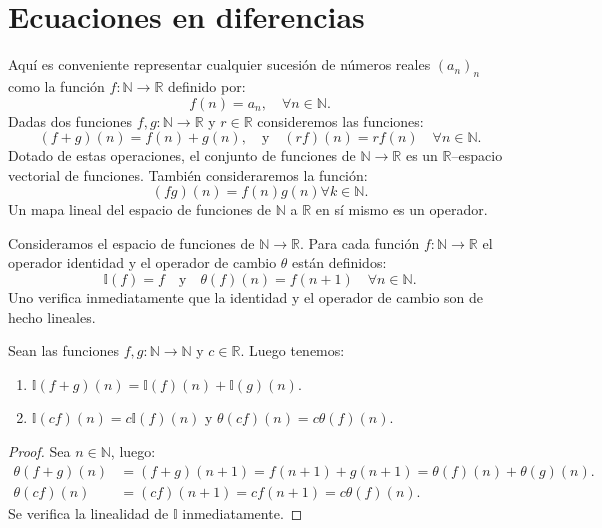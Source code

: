 \section{Ecuaciones en diferencias}

Aquí es conveniente representar cualquier sucesión de números reales $(a_{n})_{n} $ como la función $f\colon\mathds{N}\rightarrow\mathds{R}$ definido por: \[ f(n)=a_{n},\quad\forall n\in\mathds{N}. \] Dadas dos funciones $f,g\colon\mathds{N}\rightarrow\mathds{R}$ y $r\in\mathds{R} $ consideremos las funciones: \[ (f+g)(n)=f(n)+g(n),\quad\text{y}\quad(rf)(n)=rf(n)\quad\forall n\in\mathds{N}. \] Dotado de estas operaciones, el conjunto de funciones de $\mathds{N}\rightarrow\mathds{R}$ es un $\mathds{R}$--espacio vectorial de funciones. También consideraremos la función: \[ (fg)(n)=f(n)g(n)\forall k\in\mathbb{N}. \] Un mapa lineal del espacio de funciones de $\mathds{N}$ a $ \mathds{R}$ en sí mismo es un operador.

\begin{definition}
Consideramos el espacio de funciones de $\mathds{N}\to\mathds{R}$. Para cada función $f\colon\mathds{N}\rightarrow\mathds{R}$ el operador identidad y el operador de cambio $\theta$ están definidos: \[ \mathds{I}(f)=f\quad\text{y}\quad\theta(f)(n)=f(n+1)\quad\forall n\in\mathds{N}. \] Uno verifica inmediatamente que la identidad y el operador de cambio son de hecho lineales.
\end{definition}

\begin{proposition}
Sean las funciones $f,g\colon\mathds{N}\to\mathds{N}$ y $c\in\mathds{R}$. Luego tenemos:
\begin{enumerate}
	\item $\mathds{I}\left(f+g\right)(n)=\mathds{I}(f)(n)+\mathds{I}(g)(n)$.
	\item $\mathds{I}\left(cf\right)(n)=c\mathds{I}(f)(n)$ y $\theta\left(cf\right)(n)=c\theta(f)(n)$.
\end{enumerate}
\end{proposition}

\begin{proof}
	Sea $n\in\mathds{N}$, luego:
	\begin{align*}
	\theta(f+g)(n)&=(f+g)(n+1)=f(n+1)+g(n+1)=\theta(f)(n)+\theta(g)(n).\\
	\theta(cf)(n)&=(cf)(n+1)=cf(n+1)=c\theta(f)(n).
	\end{align*}
	Se verifica la linealidad de $\mathds{I}$ inmediatamente.
\end{proof}

